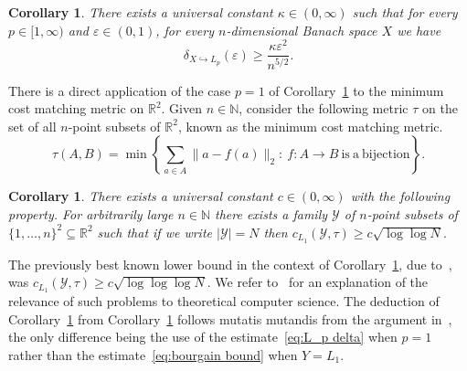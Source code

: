 \documentclass[12pt,reqno]{amsart}
\theoremstyle{plain}
\newtheorem{corollary}[theorem]{Corollary}
\theoremstyle{definition}
\newcommand{\N}{\mathbb N}
\newcommand{\e}{\varepsilon}
\renewcommand{\ge}{\geqslant}
\newcommand{\R}{\mathbb R}
\begin{document}
\begin{corollary}\label{coro:5/2}
There exists a universal constant $\kappa\in (0,\infty)$ such that for every $p\in [1,\infty)$ and $\e\in (0,1)$, for every $n$-dimensional Banach space $X$ we have
\begin{equation}\label{eq:L_p delta}
\delta_{X\hookrightarrow L_p}(\e)\ge \frac{\kappa \e^2}{n^{5/2}}.
\end{equation}
\end{corollary}
There is a direct application of the case $p=1$ of Corollary~\ref{coro:5/2} to the minimum cost matching metric on $\R^2$. Given $n\in \N$, consider the following metric $\tau$ on the set of all $n$-point subsets  of $\R^2$, known as the minimum cost matching metric.
$$
\tau(A,B) =\min\left\{\sum_{a\in A} \|a-f(a)\|_2:\ f:A\to B\ \mathrm{is\ a\ bijection}\right\}.
$$
\begin{corollary}\label{cor:EMD} There exists a universal constant $c\in (0,\infty)$ with the following property. For arbitrarily large $n\in \N$ there exists a family $\mathscr Y$ of $n$-point subsets of $\{1,\ldots,n\}^2\subseteq \R^2$ such that if we write $|\mathscr Y|= N$ then $c_{L_1}(\mathscr Y,\tau)\ge c\sqrt{\log\log N}.$
\end{corollary}
The previously best known lower bound in the context of Corollary~\ref{cor:EMD}, due to~\cite{NS07}, was $c_{L_1}(\mathscr Y,\tau)\ge c\sqrt{\log\log\log N}$. We refer to~\cite{NS07} for an explanation of the relevance of such problems to theoretical computer science. The deduction of Corollary~\ref{cor:EMD} from Corollary~\ref{coro:5/2} follows mutatis mutandis from the argument in~\cite[Sec.~3.1]{NS07}, the only difference being the use of the estimate~\eqref{eq:L_p delta} when $p=1$ rather than the estimate~\eqref{eq:bourgain bound} when $Y=L_1$.
\end{document}
